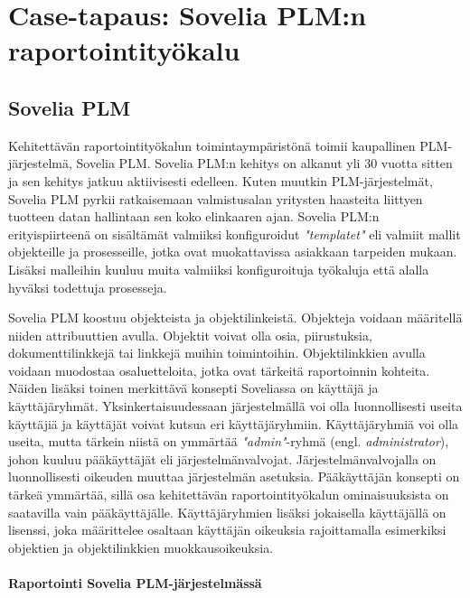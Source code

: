 \chapter{Case-tapaus: Sovelia PLM:n raportointityökalu} \label{Case-tapaus: Sovelia PLM:n raportointityökalu}

\section{Sovelia PLM} \label{PLM-järjestelmät}

Kehitettävän raportointityökalun toimintaympäristönä toimii kaupallinen PLM-järjestelmä, Sovelia PLM. Sovelia PLM:n kehitys on alkanut yli 30 vuotta sitten ja sen kehitys jatkuu aktiivisesti edelleen. Kuten muutkin PLM-järjestelmät, Sovelia PLM pyrkii ratkaisemaan valmistusalan yritysten haasteita liittyen tuotteen datan hallintaan sen koko elinkaaren ajan. \cite{soveliaAboutSovelia} Sovelia PLM:n erityispiirteenä on sisältämät valmiiksi konfiguroidut \textit{"templatet"} eli valmiit mallit objekteille ja prosesseille, jotka ovat muokattavissa asiakkaan tarpeiden mukaan. Lisäksi malleihin kuuluu muita valmiiksi konfiguroituja työkaluja että alalla hyväksi todettuja prosesseja. \cite{soveliaSoveliaGetting}

Sovelia PLM koostuu objekteista ja objektilinkeistä. Objekteja voidaan määritellä niiden attribuuttien avulla. Objektit voivat olla osia, piirustuksia, dokumenttilinkkejä tai linkkejä muihin toimintoihin. \cite{soveliaSoveliaGetting} Objektilinkkien avulla voidaan muodostaa osaluetteloita, jotka ovat tärkeitä raportoinnin kohteita. Näiden lisäksi toinen merkittävä konsepti Soveliassa on käyttäjä ja käyttäjäryhmät. Yksinkertaisuudessaan järjestelmällä voi olla luonnollisesti useita käyttäjiä ja käyttäjät voivat kutsua eri käyttäjäryhmiin. Käyttäjäryhmiä voi olla useita, mutta tärkein niistä on ymmärtää \textit{"admin"}-ryhmä (engl. \textit{administrator}), johon kuuluu pääkäyttäjät eli järjestelmänvalvojat. Järjestelmänvalvojalla on luonnollisesti oikeuden muuttaa järjestelmän asetuksia. Pääkäyttäjän konsepti on tärkeä ymmärtää, sillä osa kehitettävän raportointityökalun ominaisuuksista on saatavilla vain pääkäyttäjälle. Käyttäjäryhmien lisäksi jokaisella käyttäjällä on lisenssi, joka määrittelee osaltaan käyttäjän oikeuksia rajoittamalla esimerkiksi objektien ja objektilinkkien muokkausoikeuksia. \cite{soveliaUserManagement}

\subsubsection{Raportointi Sovelia PLM-järjestelmässä}

